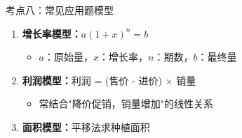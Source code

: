 \documentclass[12pt, a4paper]{article}
\begin{document}
\begin{conceptbox}{考点八：常见应用题模型}
    \begin{enumerate}
        \item \textbf{增长率模型：}$a(1+x)^n = b$
        \begin{itemize}
            \item $a$：原始量，$x$：增长率，$n$：期数，$b$：最终量
        \end{itemize}
        \item \textbf{利润模型：}利润 = (售价 - 进价) $\times$ 销量
        \begin{itemize}
            \item 常结合"降价促销，销量增加"的线性关系
        \end{itemize}
        \item \textbf{面积模型：}平移法求种植面积
    \end{enumerate}
\end{conceptbox}
\end{document}
